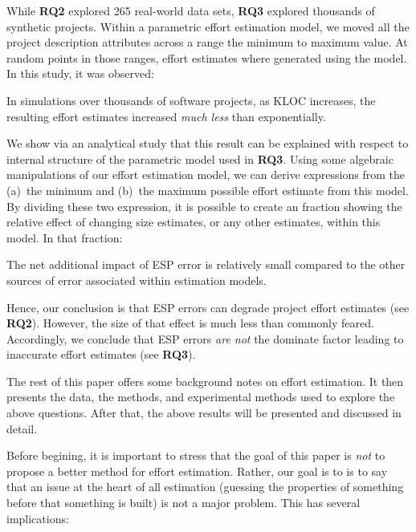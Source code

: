 \documentclass[final,twocolumn]{elsarticle}
\theoremstyle{break}
\begin{document}
While {\bf RQ2} explored 265 real-world data sets, {\bf RQ3} explored thousands
of synthetic projects.  Within a parametric effort estimation model, we moved
all the project description attributes
across a range the minimum to maximum value. At random
points in those ranges, effort estimates where generated using the model.  In this
study, it was observed:

\begin{lesson0}
  In simulations over thousands of software projects,
  as KLOC increases, the resulting effort estimates increased {\em much less} than exponentially.
\end{lesson0}

We show via an analytical study 
that this result can be explained with respect to internal structure
of the parametric model used in {\bf RQ3}. Using some algebraic manipulations of
our effort estimation model,
we can derive expressions from
 the (a)~the minimum and (b)~the
maximum possible effort estimate from this model.
By dividing these two expression, it is possible to create an fraction showing
the relative effect of changing size estimates, or any other estimates, within this model.
In that fraction:

\begin{lesson0}
  The net additional impact of ESP error is relatively small compared to the other sources of error associated within estimation models.
\end{lesson0}
Hence, our conclusion is that
ESP errors can degrade project
effort estimates (see {\bf RQ2}). However, the size of that effect is much less than commonly feared.
Accordingly, we conclude that  ESP errors {\em are not} the dominate factor leading
to inaccurate effort estimates (see {\bf RQ3}). 

The rest of this paper  offers some background notes on effort estimation.
It then presents the data, the methods, and experimental methods
used to explore the above questions. After that, the above results will be presented
and discussed in detail.

Before begining, it is important to stress
that the goal of this paper is {\em not} to propose a better method for effort
estimation.  Rather, our goal is to is to say that an issue at the heart of all
estimation (guessing the properties of something before that something is built)
is not a major problem. This has several implications:
\end{document}
